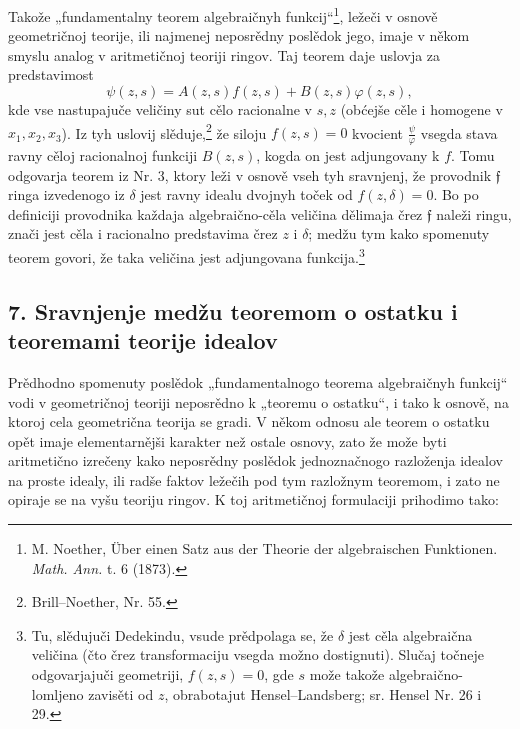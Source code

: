 \documentclass[11pt]{article}
\providecommand{\frf}{\mathfrak f}
\begin{document}
Takože „fundamentalny teorem algebraičnyh funkcij“\footnote{M. Noether, Über einen Satz aus der Theorie der algebraischen Funktionen. \emph{Math. Ann.} t. 6 (1873).}, ležeči v osnově geometričnoj teorije, ili najmenej neposrědny poslědok jego, imaje v někom smyslu analog v aritmetičnoj teoriji ringov. Taj teorem daje uslovja za predstavimost
\[
\psi(z,s)=A(z,s)f(z,s)+B(z,s)\varphi(z,s),
\]
kde vse nastupajuče veličiny sut cělo racionalne v \(s,z\) (obćejše cěle i homogene v \(x_1,x_2,x_3\)). Iz tyh uslovij slěduje,\footnote{Brill--Noether, Nr. 55.} že siloju \(f(z,s)=0\) kvocient \(\frac{\psi}{\varphi}\) vsegda stava ravny cěloj racionalnoj funkciji \(B(z,s)\), kogda on jest adjungovany k \(f\). Tomu odgovarja teorem iz Nr. 3, ktory leži v osnově vseh tyh sravnjenj, že provodnik \(\frf\) ringa izvedenogo iz \(\delta\) jest ravny idealu dvojnyh toček od \(f(z,\delta)=0\). Bo po definiciji provodnika každaja algebraično-cěla veličina dělimaja črez \(\frf\) naleži ringu, znači jest cěla i racionalno predstavima črez \(z\) i \(\delta\); medžu tym kako spomenuty teorem govori, že taka veličina jest adjungovana funkcija.\footnote{Tu, slědujuči Dedekindu, vsude prědpolaga se, že \(\delta\) jest cěla algebraična veličina (čto črez transformaciju vsegda možno dostignuti). Slučaj točneje odgovarjajuči geometriji, \(f(z,s)=0\), gde \(s\) može takože algebraično-lomljeno zavisěti od \(z\), obrabotajut Hensel--Landsberg; sr. Hensel Nr. 26 i 29.}

\subsection*{7. Sravnjenje medžu teoremom o ostatku i teoremami teorije idealov}
Prědhodno spomenuty poslědok „fundamentalnogo teorema algebraičnyh funkcij“ vodi v geometričnoj teoriji neposrědno k „teoremu o ostatku“, i tako k osnově, na ktoroj cela geometrična teorija se gradi. V někom odnosu ale teorem o ostatku opět imaje elementarnějši karakter než ostale osnovy, zato že može byti aritmetično izrečeny kako neposrědny poslědok jednoznačnogo razloženja idealov na proste idealy, ili radše faktov ležečih pod tym razložnym teoremom, i zato ne opiraje se na vyšu teoriju ringov. K toj aritmetičnoj formulaciji prihodimo tako:
\end{document}
